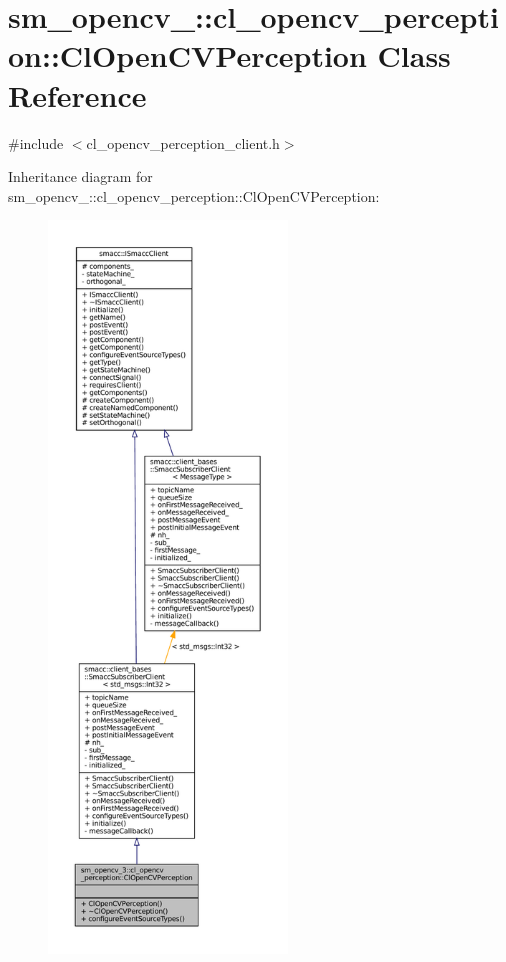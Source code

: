 \hypertarget{classsm__opencv__3_1_1cl__opencv__perception_1_1ClOpenCVPerception}{}\section{sm\+\_\+opencv\+\_\+:\+:cl\+\_\+opencv\+\_\+perception\+:\+:Cl\+Open\+C\+V\+Perception Class Reference}
\label{classsm__opencv__3_1_1cl__opencv__perception_1_1ClOpenCVPerception}


{\ttfamily \#include $<$cl\+\_\+opencv\+\_\+perception\+\_\+client.\+h$>$}



Inheritance diagram for sm\+\_\+opencv\+\_\+:\+:cl\+\_\+opencv\+\_\+perception\+:\+:Cl\+Open\+C\+V\+Perception\+:
\nopagebreak
\begin{figure}[H]
\begin{center}
\leavevmode
\includegraphics[height=550pt]{classsm__opencv__3_1_1cl__opencv__perception_1_1ClOpenCVPerception__inherit__graph}
\end{center}
\end{figure}


